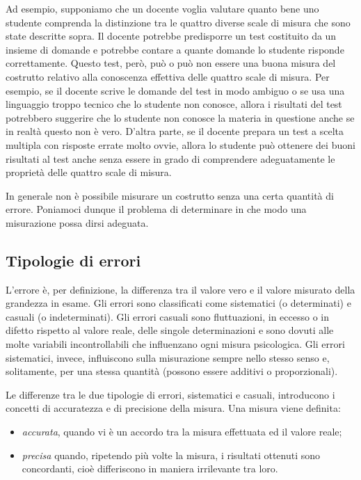 \documentclass[
  11pt,
]{krantz}
\providecommand{\tightlist}{%
  \setlength{\itemsep}{0pt}\setlength{\parskip}{0pt}}
\theoremstyle{definition}
\theoremstyle{definition}
\theoremstyle{definition}
\theoremstyle{definition}
\theoremstyle{remark}
\begin{document}
Ad esempio, supponiamo che un docente voglia valutare quanto bene uno studente comprenda la distinzione tra le quattro diverse scale di misura che sono state descritte sopra. Il docente potrebbe predisporre un test costituito da un insieme di domande e potrebbe contare a quante domande lo studente risponde correttamente. Questo test, però, può o può non essere una buona misura del costrutto relativo alla conoscenza effettiva delle quattro scale di misura. Per esempio, se il docente scrive le domande del test in modo ambiguo o se usa una linguaggio troppo tecnico che lo studente non conosce, allora i risultati del test potrebbero suggerire che lo studente non conosce la materia in questione anche se in realtà questo non è vero. D'altra parte, se il docente prepara un test a scelta multipla con risposte errate molto ovvie, allora lo studente può ottenere dei buoni risultati al test anche senza essere in grado di comprendere adeguatamente le proprietà delle quattro scale di misura.

In generale non è possibile misurare un costrutto senza una certa quantità di errore. Poniamoci dunque il problema di determinare in che modo una misurazione possa dirsi adeguata.

\hypertarget{tipologie-di-errori}{%
\subsection{Tipologie di errori}\label{tipologie-di-errori}}

L'errore è, per definizione, la differenza tra il valore vero e il valore misurato della grandezza in esame. Gli errori sono classificati come sistematici (o determinati) e casuali (o indeterminati). Gli errori casuali sono fluttuazioni, in eccesso o in difetto rispetto al valore reale, delle singole determinazioni e sono dovuti alle molte variabili incontrollabili che influenzano ogni misura psicologica. Gli errori sistematici, invece, influiscono sulla misurazione sempre nello stesso senso e, solitamente, per una stessa quantità (possono essere additivi o proporzionali).

Le differenze tra le due tipologie di errori, sistematici e casuali, introducono i concetti di accuratezza e di precisione della misura. Una misura viene definita:

\begin{itemize}
\tightlist
\item
  \emph{accurata}, quando vi è un accordo tra la misura effettuata ed il valore reale;
\item
  \emph{precisa} quando, ripetendo più volte la misura, i risultati ottenuti sono concordanti, cioè differiscono in maniera irrilevante tra loro.
\end{itemize}
\end{document}
